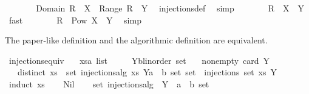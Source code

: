 \begin{isabellebody}
\ \ \ \ \isamarkupfalse%
\ \isamarkupfalse%
\ {\isachardoublequoteopen}Domain\ R\ {\isacharequal}\ X\ {\isasymand}\ Range\ R\ {\isasymsubseteq}\ Y{\isachardoublequoteclose}\ \isamarkupfalse%
\ injections{\isacharunderscore}def\ \isamarkupfalse%
\ simp\isanewline
\ \ \ \ \isamarkupfalse%
\ \isamarkupfalse%
\ {\isachardoublequoteopen}R\ {\isasymsubseteq}\ X\ {\isasymtimes}\ Y{\isachardoublequoteclose}\ \isamarkupfalse%
\ fast\isanewline
\ \ \ \ \isamarkupfalse%
\ \isamarkupfalse%
\ {\isachardoublequoteopen}R\ {\isasymin}\ Pow\ {\isacharparenleft}X\ {\isasymtimes}\ Y{\isacharparenright}{\isachardoublequoteclose}\ \isamarkupfalse%
\ simp\isanewline
\ \ \isamarkupfalse%
\isanewline
{}\isamarkupfalse%
%
\endisatagproof
{\isafoldproof}%
%
\isadelimproof
%
\endisadelimproof
%
\begin{isamarkuptext}%
The paper-like definition  and the algorithmic definition 
   are equivalent.%
\end{isamarkuptext}%
\isamarkuptrue%
\isamarkupfalse%
\ injections{\isacharunderscore}equiv{\isacharcolon}\isanewline
\ \ \ xs{\isacharcolon}{\isacharcolon}{\isachardoublequoteopen}{\isacharprime}a\ list{\isachardoublequoteclose}\isanewline
\ \ \ \ \ Y{\isacharcolon}{\isacharcolon}{\isachardoublequoteopen}{\isacharprime}b{\isasymColon}linorder\ set{\isachardoublequoteclose}\isanewline
\ \ \ non{\isacharunderscore}empty{\isacharcolon}\ {\isachardoublequoteopen}card\ Y\ {\isachargreater}\ {}{\isachardoublequoteclose}\isanewline
\ \ \ {\isachardoublequoteopen}distinct\ xs\ {\isasymLongrightarrow}\ {\isacharparenleft}set\ {\isacharparenleft}injections{\isacharunderscore}alg\ xs\ Y{\isacharparenright}{\isacharcolon}{\isacharcolon}{\isacharparenleft}{\isacharprime}a\ {\isasymtimes}\ {\isacharprime}b{\isacharparenright}\ set\ set{\isacharparenright}\ {\isacharequal}\ injections\ {\isacharparenleft}set\ xs{\isacharparenright}\ Y{\isachardoublequoteclose}\isanewline
%
\isadelimproof
%
\endisadelimproof
%
\isatagproof
{}\isamarkupfalse%
\ {\isacharparenleft}induct\ xs{\isacharparenright}\isanewline
\ \ \isamarkupfalse%
\ Nil\isanewline
\ \ \isamarkupfalse%
\ {\isachardoublequoteopen}set\ {\isacharparenleft}injections{\isacharunderscore}alg\ {\isacharbrackleft}{\isacharbrackright}\ Y{\isacharparenright}\ {\isacharequal}\ {\isacharbraceleft}{\isacharbraceleft}{\isacharbraceright}{\isacharcolon}{\isacharcolon}{\isacharparenleft}{\isacharprime}a\ {\isasymtimes}\ {\isacharprime}b{\isacharparenright}\ set{\isacharbraceright}{\isachardoublequoteclose}\ \isamarkupfalse%

\end{isabellebody}
